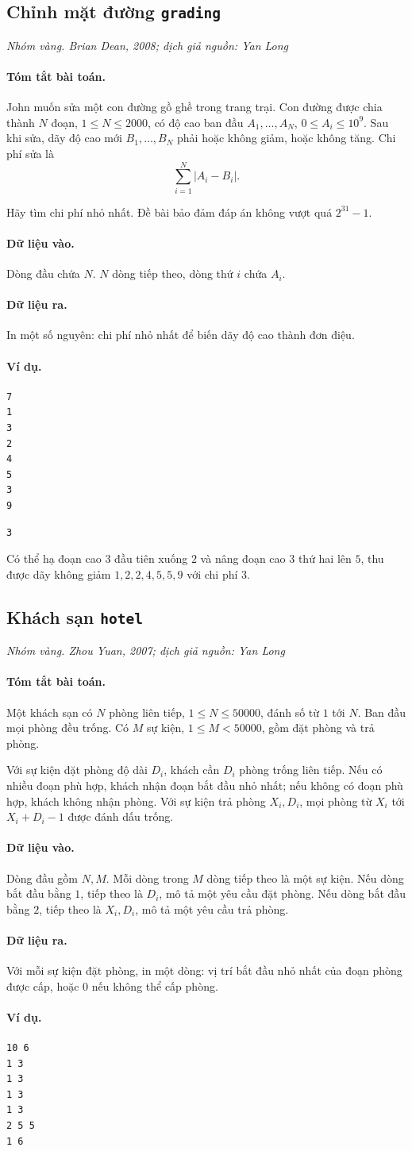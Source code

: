 \documentclass[11pt]{article}
\newcommand{\problem}[4]{%
  \subsection[#1 (#2)]{#1 \hfill {\normalsize\texttt{#2}}}%
  \noindent\textit{#3. #4}\par\smallskip
}
\newcommand{\iosec}[1]{\paragraph{#1}}
\begin{document}
\problem{Chỉnh mặt đường}{grading}{Nhóm vàng}{Brian Dean, 2008; dịch giả nguồn: Yan Long}

\iosec{Tóm tắt bài toán.}
John muốn sửa một con đường gồ ghề trong trang trại. Con đường được chia
thành \(N\) đoạn, \(1\le N\le 2000\), có độ cao ban đầu
\(A_1,\ldots,A_N\), \(0\le A_i\le 10^9\). Sau khi sửa, dãy độ cao mới
\(B_1,\ldots,B_N\) phải hoặc không giảm, hoặc không tăng. Chi phí sửa là
\[
  \sum_{i=1}^{N}|A_i-B_i|.
\]

Hãy tìm chi phí nhỏ nhất. Đề bài bảo đảm đáp án không vượt quá \(2^{31}-1\).

\iosec{Dữ liệu vào.}
Dòng đầu chứa \(N\). \(N\) dòng tiếp theo, dòng thứ \(i\) chứa \(A_i\).

\iosec{Dữ liệu ra.}
In một số nguyên: chi phí nhỏ nhất để biến dãy độ cao thành đơn điệu.

\iosec{Ví dụ.}
\begin{verbatim}
7
1
3
2
4
5
3
9
\end{verbatim}

\begin{verbatim}
3
\end{verbatim}

Có thể hạ đoạn cao \(3\) đầu tiên xuống \(2\) và nâng đoạn cao \(3\) thứ hai
lên \(5\), thu được dãy không giảm \(1,2,2,4,5,5,9\) với chi phí \(3\).

\problem{Khách sạn}{hotel}{Nhóm vàng}{Zhou Yuan, 2007; dịch giả nguồn: Yan Long}

\iosec{Tóm tắt bài toán.}
Một khách sạn có \(N\) phòng liên tiếp, \(1\le N\le 50000\), đánh số từ
\(1\) tới \(N\). Ban đầu mọi phòng đều trống. Có \(M\) sự kiện,
\(1\le M<50000\), gồm đặt phòng và trả phòng.

Với sự kiện đặt phòng độ dài \(D_i\), khách cần \(D_i\) phòng trống liên tiếp.
Nếu có nhiều đoạn phù hợp, khách nhận đoạn bắt đầu nhỏ nhất; nếu không có đoạn
phù hợp, khách không nhận phòng. Với sự kiện trả phòng \(X_i,D_i\), mọi phòng
từ \(X_i\) tới \(X_i+D_i-1\) được đánh dấu trống.

\iosec{Dữ liệu vào.}
Dòng đầu gồm \(N,M\). Mỗi dòng trong \(M\) dòng tiếp theo là một sự kiện. Nếu
dòng bắt đầu bằng \(1\), tiếp theo là \(D_i\), mô tả một yêu cầu đặt phòng.
Nếu dòng bắt đầu bằng \(2\), tiếp theo là \(X_i,D_i\), mô tả một yêu cầu trả
phòng.

\iosec{Dữ liệu ra.}
Với mỗi sự kiện đặt phòng, in một dòng: vị trí bắt đầu nhỏ nhất của đoạn phòng
được cấp, hoặc \(0\) nếu không thể cấp phòng.

\iosec{Ví dụ.}
\begin{verbatim}
10 6
1 3
1 3
1 3
1 3
2 5 5
1 6
\end{verbatim}
\end{document}
